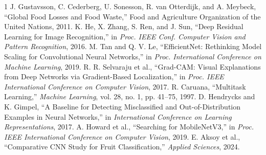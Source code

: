 \documentclass[conference]{IEEEtran}
\begin{document}
\begin{thebibliography}{1}
 J. Gustavsson, C. Cederberg, U. Sonesson, R. van Otterdijk, and A. Meybeck, ``Global Food Losses and Food Waste,'' Food and Agriculture Organization of the United Nations, 2011.
 K. He, X. Zhang, S. Ren, and J. Sun, ``Deep Residual Learning for Image Recognition,'' in \emph{Proc. IEEE Conf. Computer Vision and Pattern Recognition}, 2016.
 M. Tan and Q. V. Le, ``EfficientNet: Rethinking Model Scaling for Convolutional Neural Networks,'' in \emph{Proc. International Conference on Machine Learning}, 2019.
 R. R. Selvaraju et al., ``Grad-CAM: Visual Explanations from Deep Networks via Gradient-Based Localization,'' in \emph{Proc. IEEE International Conference on Computer Vision}, 2017.
 R. Caruana, ``Multitask Learning,'' \emph{Machine Learning}, vol. 28, no. 1, pp. 41--75, 1997.
 D. Hendrycks and K. Gimpel, ``A Baseline for Detecting Misclassified and Out-of-Distribution Examples in Neural Networks,'' in \emph{International Conference on Learning Representations}, 2017.
 A. Howard et al., ``Searching for MobileNetV3,'' in \emph{Proc. IEEE International Conference on Computer Vision}, 2019.
 E. Aksoy et al., ``Comparative CNN Study for Fruit Classification,'' \emph{Applied Sciences}, 2024.
\end{thebibliography}
\end{document}
